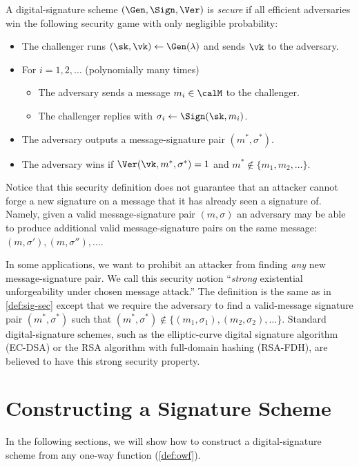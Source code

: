 \begin{definition}\label{def:sig-sec}
  A digital-signature scheme $(\Gen, \Sign, \Ver)$ is \emph{secure} if
  all efficient adversaries win the following security 
  game with only negligible probability:
  \begin{itemize}[noitemsep]
    \item The challenger runs $(\sk, \vk) \gets \Gen(\lambda)$ and sends $\vk$ to the adversary.
    \item For $i = 1, 2, \dots$  (polynomially many times)
      \begin{itemize}
        \item The adversary sends a message $m_i \in \calM$ to the challenger.
        \item The challenger replies with $\sigma_i \gets \Sign(\sk, m_i)$.
      \end{itemize}
    \item The adversary outputs a message-signature pair $(m^*, \sigma^*)$.
    \item The adversary wins if $\Ver(\vk, m^*, \sigma^*) = 1$ and $m^* \not \in \{m_1, m_2, \dots\}$.
  \end{itemize}
\end{definition}

Notice that this   security definition does not guarantee that an attacker cannot forge a new signature on a message that it has already seen a signature of. 
Namely, given a valid
message-signature pair $(m, \sigma)$ an adversary may be able to produce additional valid message-signature
pairs on the same message: $(m, \sigma'), (m, \sigma''), \dots$.

In some applications, we want to prohibit an attacker from finding \emph{any}
new message-signature pair. We call this security notion ``\emph{strong} existential unforgeability under chosen message attack.''  
The definition is the same as in \cref{def:sig-sec} except that we require
the adversary to find a valid-message signature pair $(m^*, \sigma^*)$
such that $(m^*, \sigma^*) \not \in \{ (m_1, \sigma_1), (m_2, \sigma_2), \dots \}$.
Standard digital-signature schemes, such as the elliptic-curve digital signature
algorithm (EC-DSA) or the RSA algorithm with full-domain hashing (RSA-FDH),
are believed to have this strong security property.

\section{Constructing a Signature Scheme}
In the following sections, we will show how to construct a digital-signature
scheme from any one-way function (\cref{def:owf}).

